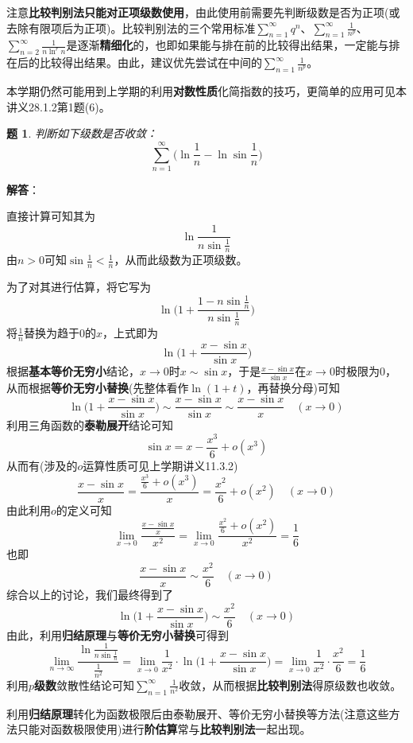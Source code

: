 \documentclass[a4paper,UTF8,fontset=windows,AutoFakeBold]{ctexart}
\newcommand*{\suminf}[1][n=1]{\sum_{#1}^\infty}
\newcommand*{\note}{\noindent *}
\theoremstyle{ex}
\newtheorem{exercise}{题}
\newcommand{\sol}[1]{{\vspace{5pt}\kaishu\noindent\textbf{解答}：\vspace{-3pt}
\begin{compactitem}
    \item[] #1
\end{compactitem}
}}
\begin{document}
\note 注意\textbf{比较判别法只能对正项级数使用}，由此使用前需要先判断级数是否为正项(或去除有限项后为正项)。比较判别法的三个常用标准$\suminf q^n$、$\suminf\frac{1}{n^p}$、$\suminf[n=2]\frac{1}{n\ln^rn}$是逐渐\textbf{精细化}的，也即如果能与排在前的比较得出结果，一定能与排在后的比较得出结果。由此，建议优先尝试在中间的$\suminf\frac{1}{n^p}$。

\note 本学期仍然可能用到上学期的利用\textbf{对数性质}化简指数的技巧，更简单的应用可见本讲义28.1.2第1题(6)。

\begin{framed}
\begin{exercise}
    判断如下级数是否收敛：
    $$\suminf\bigg(\ln\frac{1}{n}-\ln\sin\frac{1}{n}\bigg)$$
\end{exercise}
\sol{
    直接计算可知其为
    $$\ln\frac{1}{n\sin\frac{1}{n}}$$
    由$n>0$可知$\sin\frac{1}{n}<\frac{1}{n}$，从而此级数为正项级数。

    为了对其进行估算，将它写为
    $$\ln\bigg(1+\frac{1-n\sin\frac{1}{n}}{n\sin\frac{1}{n}}\bigg)$$
    将$\frac{1}{n}$替换为趋于0的$x$，上式即为
    $$\ln\bigg(1+\frac{x-\sin x}{\sin x}\bigg)$$
    根据\textbf{基本等价无穷小}结论，$x\to0$时$x\sim\sin x$，于是$\frac{x-\sin x}{\sin x}$在$x\to0$时极限为0，从而根据\textbf{等价无穷小替换}(先整体看作$\ln(1+t)$，再替换分母)可知
    $$\ln\bigg(1+\frac{x-\sin x}{\sin x}\bigg)\sim\frac{x-\sin x}{\sin x}\sim\frac{x-\sin x}{x}\quad(x\to0)$$
    利用三角函数的\textbf{泰勒展开}结论可知
    $$\sin x=x-\frac{x^3}{6}+o(x^3)$$
    从而有(涉及的$o$运算性质可见上学期讲义11.3.2)
    $$\frac{x-\sin x}{x}=\frac{\frac{x^3}{6}+o(x^3)}{x}=\frac{x^2}{6}+o(x^2)\quad(x\to0)$$
    由此利用$o$的定义可知
    $$\lim_{x\to0}\frac{\frac{x-\sin x}{x}}{x^2}=\lim_{x\to0}\frac{\frac{x^2}{6}+o(x^2)}{x^2}=\frac{1}{6}$$
    也即
    $$\frac{x-\sin x}{x}\sim\frac{x^2}{6}\quad(x\to0)$$
    综合以上的讨论，我们最终得到了
    $$\ln\bigg(1+\frac{x-\sin x}{\sin x}\bigg)\sim\frac{x^2}{6}\quad(x\to0)$$
    由此，利用\textbf{归结原理}与\textbf{等价无穷小替换}可得到
    $$\lim_{n\to\infty}\frac{\ln\frac{1}{n\sin\frac{1}{n}}}{\frac{1}{n^2}}=\lim_{x\to0}\frac{1}{x^2}\cdot\ln\bigg(1+\frac{x-\sin x}{\sin x}\bigg)=\lim_{x\to0}\frac{1}{x^2}\cdot\frac{x^2}{6}=\frac{1}{6}$$
    利用\textbf{$p$级数}敛散性结论可知$\suminf\frac{1}{n^2}$收敛，从而根据\textbf{比较判别法}得原级数也收敛。
}
\end{framed}

\note 利用\textbf{归结原理}转化为函数极限后由泰勒展开、等价无穷小替换等方法(注意这些方法只能对函数极限使用)进行\textbf{阶估算}常与\textbf{比较判别法}一起出现。
\end{document}

